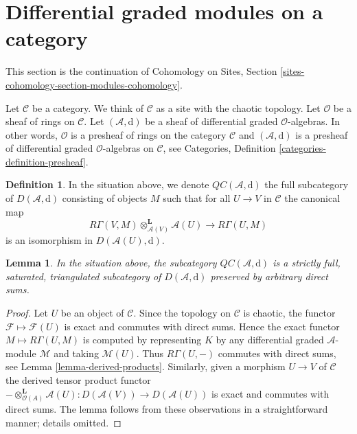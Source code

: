 \documentclass{stacks-project}
\theoremstyle{plain}
\newtheorem{lemma}[subsection]{Lemma}
\theoremstyle{definition}
\newtheorem{definition}[subsection]{Definition}
\theoremstyle{remark}
\numberwithin{equation}{subsection}
\begin{document}
\section{Differential graded modules on a category}
\label{section-modules-cohomology}

\noindent
This section is the continuation of
Cohomology on Sites, Section \ref{sites-cohomology-section-modules-cohomology}.

\medskip\noindent
Let $\mathcal{C}$ be a category. We think of $\mathcal{C}$ as a site with
the chaotic topology. Let $\mathcal{O}$ be a sheaf of rings on $\mathcal{C}$.
Let $(\mathcal{A}, \text{d})$ be a sheaf of differential graded
$\mathcal{O}$-algebras. In other words, $\mathcal{O}$ is
a presheaf of rings on the category $\mathcal{C}$ and
$(\mathcal{A}, \text{d})$ is a presheaf of differential graded
$\mathcal{O}$-algebras on $\mathcal{C}$, see
Categories, Definition \ref{categories-definition-presheaf}.

\begin{definition}
\label{definition-cartesian}
In the situation above, we denote
{\it $\mathit{QC}(\mathcal{A}, \text{d})$}
the full subcategory of $D(\mathcal{A}, \text{d})$
consisting of objects $M$ such that
for all $U \to V$ in $\mathcal{C}$ the canonical map
$$
R\Gamma(V, M) \otimes_{\mathcal{A}(V)}^\mathbf{L} \mathcal{A}(U)
\longrightarrow
R\Gamma(U, M)
$$
is an isomorphism in $D(\mathcal{A}(U), \text{d})$.
\end{definition}

\begin{lemma}
\label{lemma-cartesian-good-sub}
In the situation above, the subcategory $\mathit{QC}(\mathcal{A}, \text{d})$
is a strictly full, saturated, triangulated subcategory of
$D(\mathcal{A}, \text{d})$ preserved by arbitrary direct sums.
\end{lemma}

\begin{proof}
Let $U$ be an object of $\mathcal{C}$. Since the topology
on $\mathcal{C}$ is chaotic, the functor $\mathcal{F} \mapsto \mathcal{F}(U)$
is exact and commutes with direct sums. Hence the exact functor
$M \mapsto R\Gamma(U, M)$ is computed by representing $K$ by any
differential graded $\mathcal{A}$-module
$\mathcal{M}$ and taking $\mathcal{M}(U)$.
Thus $R\Gamma(U, -)$ commutes with direct sums, see
Lemma \ref{lemma-derived-products}.
Similarly, given a morphism $U \to V$ of $\mathcal{C}$
the derived tensor product functor
$- \otimes_{\mathcal{O}(A)}^\mathbf{L} \mathcal{A}(U) :
D(\mathcal{A}(V)) \to D(\mathcal{A}(U))$
is exact and commutes with direct sums. The lemma follows
from these observations in a straightforward manner; details omitted.
\end{proof}
\end{document}
